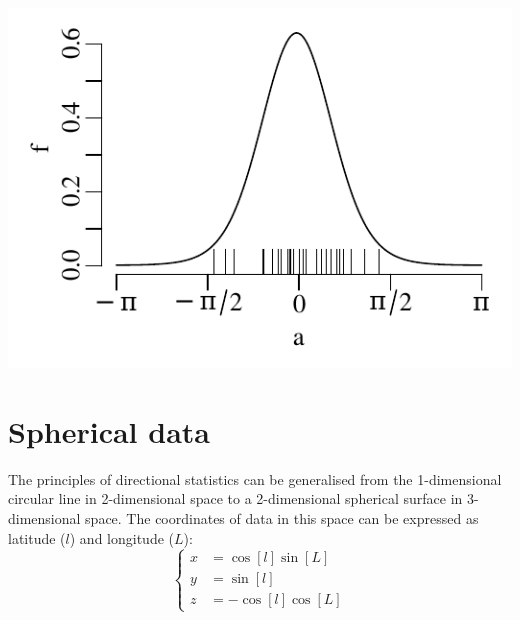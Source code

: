 \noindent\begin{minipage}[t][][b]{.4\textwidth}
\includegraphics[]{../figures/kappastriations.pdf}\medskip
\end{minipage}
\begin{minipage}[t][][t]{.6\textwidth}
  \label{fig:kappastriations}
\end{minipage}

\section{Spherical data}
\label{sec:spherical-data}

The principles of directional statistics can be generalised from the
1-dimensional circular line in 2-dimensional space to a 2-dimensional
spherical surface in 3-dimensional space. The coordinates of data in
this space can be expressed as latitude ($l$) and longitude ($L$):
\begin{equation}
  \left\{
  \begin{split}
    x & = \cos[l]\sin[L]\\
    y & = \sin[l]\\
    z & = -\cos[l]\cos[L]
  \end{split}
  \right.
  \label{eq:lL}
\end{equation}

